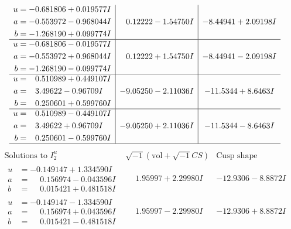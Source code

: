 \documentclass[1p]{elsarticle_modified}
\theoremstyle{definition}
\newcommand{\I}{\sqrt{-1}}
\begin{document}
$$\begin{array}{c|c|c}
\begin{aligned}
u &= -0.681806 + 0.019577 I \\
a &= -0.553972 - 0.968044 I \\
b &= -1.268190 + 0.099774 I\end{aligned}
 & \phantom{-}0.12222 - 1.54750 I & -8.44941 + 2.09198 I \\ \hline\begin{aligned}
u &= -0.681806 - 0.019577 I \\
a &= -0.553972 + 0.968044 I \\
b &= -1.268190 - 0.099774 I\end{aligned}
 & \phantom{-}0.12222 + 1.54750 I & -8.44941 - 2.09198 I \\ \hline\begin{aligned}
u &= \phantom{-}0.510989 + 0.449107 I \\
a &= \phantom{-}3.49622 - 0.96709 I \\
b &= \phantom{-}0.250601 + 0.599760 I\end{aligned}
 & -9.05250 - 2.11036 I & -11.5344 + 8.6463 I \\ \hline\begin{aligned}
u &= \phantom{-}0.510989 - 0.449107 I \\
a &= \phantom{-}3.49622 + 0.96709 I \\
b &= \phantom{-}0.250601 - 0.599760 I\end{aligned}
 & -9.05250 + 2.11036 I & -11.5344 - 8.6463 I\\
 \hline 
 \end{array}$$\newpage$$\begin{array}{c|c|c}  
\text{Solutions to }I^u_{2}& \I (\text{vol} + \sqrt{-1}CS) & \text{Cusp shape}\\
 \hline 
\begin{aligned}
u &= -0.149147 + 1.334590 I \\
a &= \phantom{-}0.156974 - 0.043596 I \\
b &= \phantom{-}0.015421 + 0.481518 I\end{aligned}
 & \phantom{-}1.95997 + 2.29980 I & -12.9306 - 8.8872 I \\ \hline\begin{aligned}
u &= -0.149147 - 1.334590 I \\
a &= \phantom{-}0.156974 + 0.043596 I \\
b &= \phantom{-}0.015421 - 0.481518 I\end{aligned}
 & \phantom{-}1.95997 - 2.29980 I & -12.9306 + 8.8872 I \\ \hline\begin{aligned}

\end{aligned}
\end{array}$$
\end{document}
